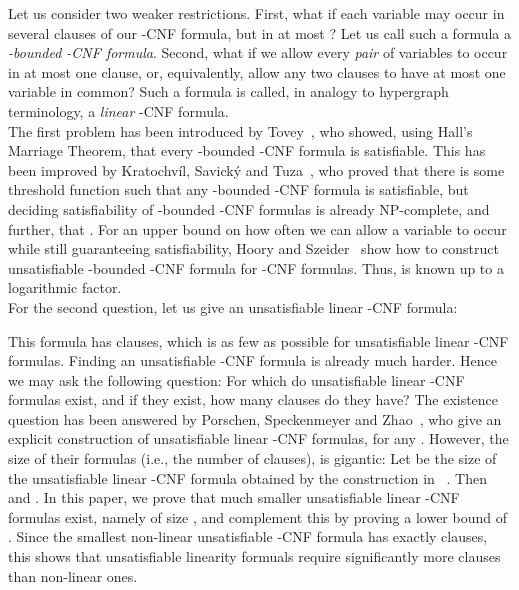 \documentclass[envcountsect, envcountsame]{llncs}
\begin{document}
Let us consider two weaker restrictions. First, what if each variable
may occur in several clauses of our -CNF formula, but in at most
? Let us call such a formula a {\em -bounded -CNF formula}.
Second, what if we allow every {\em pair} of variables to occur in at
most one clause, or, equivalently, allow any two clauses to have at
most one variable in common? Such a formula is called, in analogy to
hypergraph terminology, a {\em linear} -CNF formula.\\

The first problem has been introduced by Tovey~\cite{Tovey84}, who
showed, using Hall's Marriage Theorem, that every -bounded -CNF
formula is satisfiable. This has been improved by Kratochv\'{i}l,
Savick\'{y} and Tuza~\cite{KST93}, who proved that there is some
threshold function  such that any -bounded -CNF formula
is satisfiable, but deciding satisfiability of -bounded
-CNF formulas is already NP-complete, and further, that .  For an upper bound on how often we can allow a
variable to occur while still guaranteeing satisfiability, Hoory and
Szeider~\cite{HS06} show how to construct unsatisfiable -bounded
-CNF formula for -CNF formulas.
Thus,  is known up to a logarithmic factor.\\

For the second question, let us give an unsatisfiable linear
-CNF formula: 

This formula has  clauses, which is as few as possible for
unsatisfiable linear -CNF formulas. Finding an unsatisfiable
-CNF formula is already much harder. Hence we may ask the following
question: For which  do unsatisfiable linear -CNF formulas
exist, and if they exist, how many clauses do they have?  The
existence question has been answered by Porschen, Speckenmeyer and
Zhao~\cite{PSZ08}, who give an explicit construction of unsatisfiable
linear -CNF formulas, for any .  However, the size of their
formulas (i.e., the number of clauses), is gigantic: Let  be the
size of the unsatisfiable linear -CNF formula obtained by the
construction in ~\cite{PSZ08}.  Then  and . In this paper, we prove that much smaller unsatisfiable
linear -CNF formulas exist, namely of size , and
complement this by proving a lower bound of .
Since the smallest non-linear unsatisfiable -CNF formula has
exactly  clauses, this shows that unsatisfiable linearity
formuals require
significantly more clauses than non-linear ones.\\
\end{document}
